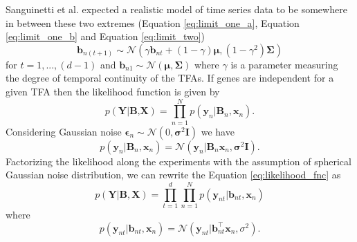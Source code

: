 Sanguinetti et al. \cite{Sanguinetti:2006} expected a realistic model of time series data to be somewhere in between these two extremes (Equation \ref{eq:limit_one_a}, Equation \ref{eq:limit_one_b} and Equation \ref{eq:limit_two})
\begin{equation} \label{eq:tfa_SanG_update}
\textbf{b}_{n(t+1)} \sim \mathcal{N} (\gamma \textbf{b}_{nt} + (1-\gamma)\boldsymbol{\mu},(1-\gamma^2)\boldsymbol{\Sigma})
\end{equation}
for $ t= 1, ... , (d-1)$ and $ \textbf{b}_{n1} \sim \mathcal{N} ( \boldsymbol{\mu},\boldsymbol{\Sigma})$
where $\gamma$ is a parameter measuring the degree of temporal continuity of the TFAs. If genes are independent for a given TFA then the likelihood function is given by
\begin{equation} \label{eq:likelihood_fnc}
p\left(\textbf{Y}|\textbf{B,X}\right)= \prod_{n \mathop = 1}^{N} p\left(\textbf{y}_n|\textbf{B}_n,\textbf{x}_n\right).
\end{equation}
Considering Gaussian noise $\boldsymbol{\epsilon}_n \sim \mathcal{N} \left(0,\boldsymbol{\sigma}^2\textbf{I}\right)$ we have
\begin{equation} \label{eq:likelihood_fnc_SingleGene}
p\left(\textbf{y}_n|\textbf{B}_n,\textbf{x}_n\right)= \mathcal{N} \left(\textbf{y}_n|\textbf{B}_n \textbf{x}_n, \boldsymbol{\sigma}^2\textbf{I} \right).
\end{equation}
Factorizing the likelihood along the experiments with the assumption of spherical Gaussian noise distribution, we can rewrite the Equation \ref{eq:likelihood_fnc} as
\begin{equation} \label{eq:likelihood_factorize}
p\left(\textbf{Y}|\textbf{B},\textbf{X}\right)= 
\prod_{t \mathop = 1}^{d} \prod_{n \mathop = 1}^{N} p\left(\textbf{y}_{nt}|\textbf{b}_{nt},\textbf{x}_n\right)
\end{equation}
where
\begin{equation} \label{eq:likelihood_fnc_allGene}
p\left(\textbf{y}_{nt}|\textbf{b}_{nt},\textbf{x}_n\right)= \mathcal{N} \left(\textbf{y}_{nt}|\textbf{b}^\top_{nt}\textbf{x}_n,\sigma^2 \right).
\end{equation}

